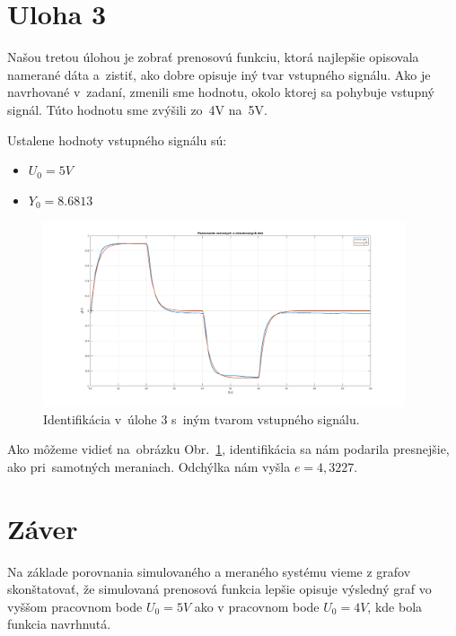 \documentclass{article}
\begin{document}
\section{Uloha 3}
\label{subsec:U3}

Našou tretou úlohou je zobrať prenosovú funkciu, ktorá najlepšie opisovala namerané dáta a~zistiť, ako dobre opisuje
iný tvar vstupného signálu. Ako je navrhované v~zadaní, zmenili sme hodnotu, okolo ktorej sa pohybuje vstupný signál.
Túto hodnotu sme zvýšili zo~4V na~5V.

Ustalene hodnoty vstupného signálu sú:
\begin{itemize}
	\item $U_0 = 5V$
	\item $Y_0 = 8.6813$
\end{itemize}

\begin{figure}[!htbp]
	\begin{center}
		\includegraphics[width=0.95\textwidth]{include/uloha3.png}
	\end{center}
	\caption{Identifikácia v~úlohe 3 s~iným tvarom vstupného signálu.}
	\label{fig:u3}
\end{figure}

Ako môžeme vidieť na~obrázku Obr.~\ref{fig:u3}, identifikácia sa nám podarila presnejšie, ako pri~samotných meraniach.
Odchýlka nám vyšla $e = 4,3227$.

\clearpage

\section{Záver}
\label{sec:zaver}

Na základe porovnania simulovaného a meraného systému vieme z grafov skonštatovať, že simulovaná prenosová funkcia
lepšie opisuje výsledný graf vo vyššom pracovnom bode $U_0 = 5V$ ako v pracovnom bode $U_0 = 4V$, kde bola funkcia
navrhnutá.
\end{document}
